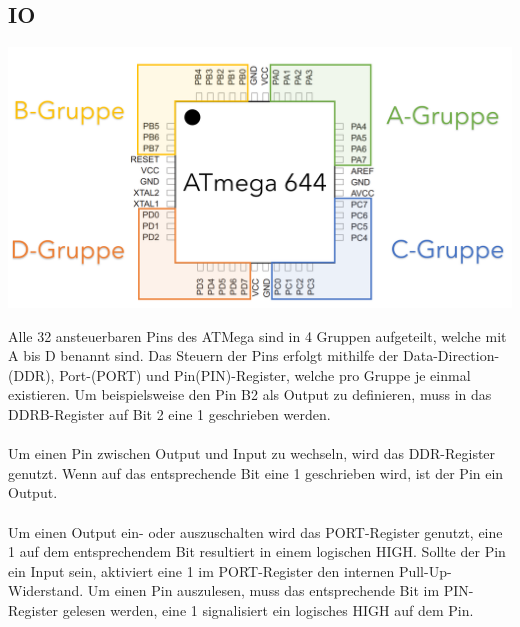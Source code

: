 \documentclass[12pt]{article}
\begin{document}
\subsection{IO}
\includegraphics[width=\textwidth]{img/ATmegaPinout.PNG}
\begin{center}
\end{center}
Alle 32 ansteuerbaren Pins des ATMega sind in 4 Gruppen aufgeteilt, welche mit A bis D benannt sind. Das Steuern der Pins erfolgt mithilfe der Data-Direction-(DDR), Port-(PORT) und Pin(PIN)-Register, welche pro Gruppe je einmal existieren. Um beispielsweise den Pin B2 als Output zu definieren, muss in das DDRB-Register auf Bit 2 eine 1 geschrieben werden.
\\\\Um einen Pin zwischen Output und Input zu wechseln, wird das DDR-Register genutzt. Wenn auf das entsprechende Bit eine 1 geschrieben wird, ist der Pin ein Output.\\\\
Um einen Output ein- oder auszuschalten wird das PORT-Register genutzt, eine 1 auf dem entsprechendem Bit resultiert in einem logischen HIGH. Sollte der Pin ein Input sein, aktiviert eine 1 im PORT-Register den internen Pull-Up-Widerstand. Um einen Pin auszulesen, muss das entsprechende Bit im PIN-Register gelesen werden, eine 1 signalisiert ein logisches HIGH auf dem Pin.
\end{document}
